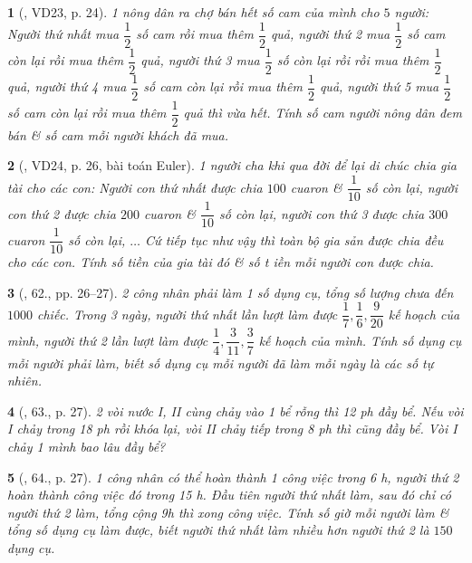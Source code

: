 \documentclass{article}
\newtheorem{baitoan}{}
\begin{document}
\begin{baitoan}[\cite{Binh_Toan_6_tap_2}, VD23, p. 24]
	1 nông dân ra chợ bán hết số cam của mình cho $5$ người: Người thứ nhất mua $\dfrac{1}{2}$ số cam rồi mua thêm $\dfrac{1}{2}$ quả, người thứ 2 mua $\dfrac{1}{2}$ số cam còn lại rồi mua thêm $\dfrac{1}{2}$ quả, người thứ 3 mua $\dfrac{1}{2}$ số còn lại rồi rồi mua thêm $\dfrac{1}{2}$ quả, người thứ 4 mua $\dfrac{1}{2}$ số cam còn lại rồi mua thêm $\dfrac{1}{2}$ quả, người thứ 5 mua $\dfrac{1}{2}$ số cam còn lại rồi mua thêm $\dfrac{1}{2}$ quả thì vừa hết. Tính số cam người nông dân đem bán \& số cam mỗi người khách đã mua.
\end{baitoan}

\begin{baitoan}[\cite{Binh_Toan_6_tap_2}, VD24, p. 26, bài toán Euler]
	1 người cha khi qua đời để lại di chúc chia gia tài cho các con: Người con thứ nhất được chia $100$ cuaron \& $\dfrac{1}{10}$ số còn lại, người con thứ 2  được chia $200$ cuaron \& $\dfrac{1}{10}$ số còn lại, người con thứ 3 được chia $300$ cuaron $\dfrac{1}{10}$ số còn lại, $\ldots$ Cứ tiếp tục như vậy thì toàn bộ gia sản được chia đều cho các con. Tính số tiền của gia tài đó \& số t iền mỗi người con được chia.
\end{baitoan}

\begin{baitoan}[\cite{Binh_Toan_6_tap_2}, 62., pp. 26--27]
	2 công nhân phải làm 1 số dụng cụ, tổng số lượng chưa đến $1000$ chiếc. Trong 3 ngày, người thứ nhất lần lượt làm được $\dfrac{1}{7},\dfrac{1}{6},\dfrac{9}{20}$ kế hoạch của mình, người thứ 2 lần lượt làm được $\dfrac{1}{4},\dfrac{3}{11},\dfrac{3}{7}$ kế hoạch của mình. Tính số dụng cụ mỗi người phải làm, biết số dụng cụ mỗi người đã làm mỗi ngày là các số tự nhiên.
\end{baitoan}

\begin{baitoan}[\cite{Binh_Toan_6_tap_2}, 63., p. 27]
	2 vòi nước I, II cùng chảy vào 1 bể rỗng thì {\rm12 ph} đầy bể. Nếu vòi I chảy trong {\rm18 ph} rồi khóa lại, vòi II chảy tiếp trong {\rm8 ph} thì cũng đầy bể. Vòi I chảy 1 mình bao lâu đầy bể?
\end{baitoan}

\begin{baitoan}[\cite{Binh_Toan_6_tap_2}, 64., p. 27]
	1 công nhân có thể hoàn thành 1 công việc trong {\rm6 h}, người thứ 2 hoàn thành công việc đó trong {\rm15 h}. Đầu tiên người thứ nhất làm, sau đó chỉ có người thứ 2 làm, tổng cộng {\rm9h} thì xong công việc. Tính số giờ mỗi người làm \& tổng số dụng cụ làm được, biết người thứ nhất làm nhiều hơn người thứ 2 là $150$ dụng cụ.
\end{baitoan}
\end{document}
